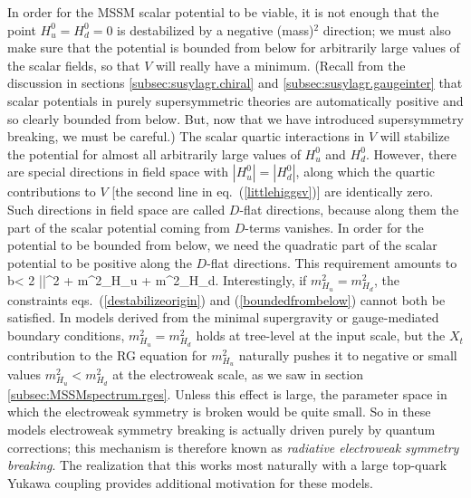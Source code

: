 In order for the MSSM scalar potential to be viable, it is not enough that
the point $H_u^0=H_d^0=0$ is
destabilized by a negative (mass)$^2$ direction; we must also
make sure that the potential is bounded from below for
arbitrarily large values of the scalar fields, so that $V$ will really
have a minimum.
(Recall from the discussion in sections
\ref{subsec:susylagr.chiral} and \ref{subsec:susylagr.gaugeinter} that
scalar potentials
in purely supersymmetric theories are automatically positive and
so  clearly bounded from below. But,
now that we have introduced supersymmetry breaking, we must be careful.)
The scalar quartic interactions in $V$ will stabilize the potential
for almost all arbitrarily large values of $H_u^0$ and $H_d^0$.
However, there
are special directions in
field space with $|H_u^0| = |H_d^0|$,
along which the quartic contributions to $V$
[the second line in eq.~(\ref{littlehiggsv})] are identically zero.
Such directions in field space are called $D$-flat directions, because
along them the part of the scalar potential coming from $D$-terms vanishes.
In order for the potential to be bounded from below, we need the
quadratic part of the scalar potential to be positive along the
$D$-flat directions. This requirement amounts to
 b< 2 |\mu |^2 + m^2_{H_u} + m^2_{H_d}.
\label{boundedfrombelow}
\eeq
 Interestingly, if $m_{H_u}^2 = m_{H_d}^2$,
the constraints eqs.~(\ref{destabilizeorigin}) and
(\ref{boundedfrombelow}) cannot both be satisfied.
In models derived from the minimal supergravity or gauge-mediated
boundary
conditions,
$m_{H_u}^2 = m_{H_d}^2$ holds at tree-level at the input scale, but
the $X_t$ contribution to the RG equation for $m_{H_u}^2$ naturally
pushes it to negative or small values $m_{H_u}^2 < m_{H_d}^2$
at the electroweak scale,
as we saw in section \ref{subsec:MSSMspectrum.rges}.
Unless this effect is large, the parameter space in which
the electroweak symmetry is broken would be quite small.
So in these models
electroweak symmetry breaking is actually driven purely by
quantum corrections; this mechanism is therefore
known as {\it radiative electroweak symmetry breaking}.
The realization that this works most
naturally with a large top-quark
Yukawa coupling provides additional motivation for these
models.\cite{rges1,rewsb}

